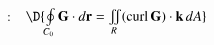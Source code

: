 \documentclass[11pt]{article}
\begin{document}
:  \,\,
$\D{
\oint \limits_{C_0} {\bf G} \cdot d{\bf r} = \iint \limits_{R} (\text{curl} \, {\bf G})\cdot {\bf k}\, dA %
}$

	
\end{document}

